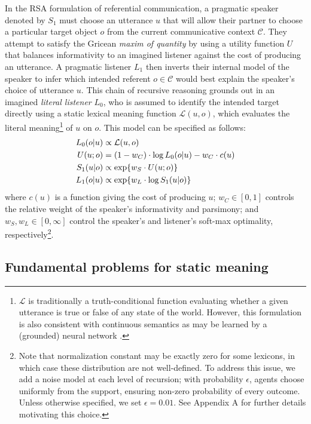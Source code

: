 In the RSA formulation of referential communication, a pragmatic speaker denoted by $S_1$ must choose an utterance $u$ that will allow their partner to choose a particular target object $o$ from the current communicative context $\mathcal{C}$.
They attempt to satisfy the Gricean \emph{maxim of quantity} by using a utility function $U$ that balances informativity to an imagined listener against the cost of producing an utterance. 
A pragmatic listener $L_1$ then inverts their internal model of the speaker to infer which intended referent $o\in\mathcal{C}$ would best explain the speaker's choice of utterance $u$.
This chain of recursive reasoning grounds out in an imagined \emph{literal listener} $L_0$, who is assumed to identify the intended target directly using a static lexical meaning function $\mathcal{L}(u,o)$, which evaluates the literal meaning\footnote{$\mathcal{L}$ is traditionally a truth-conditional function evaluating whether a given utterance is true or false of any state of the world. However, this formulation is also consistent with continuous semantics \cite{degen2020redundancy} as may be learned by a (grounded) neural network \cite{potts2019case}.} of $u$ on $o$.
This model can be specified as follows:
\begin{align}
L_0(o | u) &\propto  \mathcal{L}(u,o)\hfill\label{eq:RSA}\\
U(u; o) & = (1-w_C) \cdot \log L_0(o | u) - w_C \cdot c(u) \nonumber \\
S_1(u | o) &\propto   \exp\{w_S \cdot U(u; o)\}\nonumber  \\
L_1(o | u) &\propto   \exp\{w_L \cdot \log S_1(u | o)\}\nonumber
\end{align}
where $c(u)$ is a function giving the cost of producing $u$; $w_C \in [0,1]$ controls the relative weight of the speaker's informativity and parsimony; and $w_S,w_L \in[0,\infty]$ control the speaker's and listener's soft-max optimality, respectively\footnote{Note that normalization constant may be exactly zero for some lexicons, in which case these distribution are not well-defined. To address this issue, we add a noise model at each level of recursion; with probability $\epsilon$, agents choose uniformly from the support, ensuring non-zero probability of every outcome. Unless otherwise specified, we set $\epsilon = 0.01$. See Appendix A for further details motivating this choice.}.

\subsection{Fundamental problems for static meaning}

